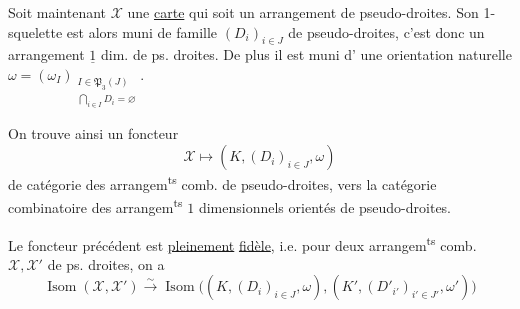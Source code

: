 Soit maintenant $\mathcal X$ une \uline{carte} qui
soit un arrangement de pseudo-droites.
Son 1-squelette  est alors muni de 
famille $(D_i)_{i\in J}$ de pseudo-droites, c'est
donc un arrangement $\underline{1}$ dim. de
ps. droites. De plus il est muni d'
une orientation naturelle $\omega=(\omega_I)_{\substack{I\in\mathfrak P_3(J)\\\bigcap_{i\in I}D_i=\varnothing}}$.

On trouve ainsi un foncteur
\[\mathcal X\longmapsto (K,(D_i)_{i\in J},\omega)\tag*{(18)}\]
de  catégorie des arrangem\textsuperscript{ts} comb. de
pseudo-droites, vers la catégorie combinatoire
des arrangem\textsuperscript{ts} $1$ dimensionnels orientés de
pseudo-droites.

%
\uline{} Le foncteur précédent est \uline{pleinement}
\uline{fidèle}, i.e. pour deux arrangem\textsuperscript{ts} comb.
$\mathcal X,\mathcal X'$ de ps. droites, on a
\[\operatorname{Isom}(\mathcal X,\mathcal X')\xrightarrow{\sim}\operatorname{Isom}\big((K,(D_i)_{i\in J},\omega),(K',(D'_{i'})_{i'\in J'},\omega')\big)\]

